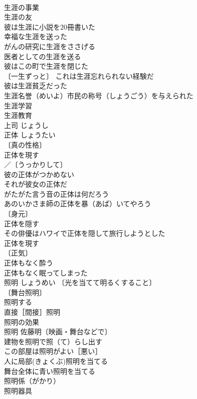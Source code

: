 \documentclass[8pt]{extreport}
\begin{document}
\begin{CJK}{UTF8}{min}
\\	生涯の事業 
\\	生涯の友 
\\	彼は生涯に小説を20冊書いた 
\\	幸福な生涯を送った 
\\	がんの研究に生涯をささげる 
\\	医者としての生涯を送る 
\\	彼はこの町で生涯を閉じた 
\\	〔一生ずっと〕 これは生涯忘れられない経験だ 
\\	彼は生涯貧乏だった 
\\	生涯名誉（めいよ）市民の称号（しょうごう）を与えられた 
\\	生涯学習 
\\	生涯教育 
\\	上司	じょうし	
\\	正体	しょうたい	
\\	〔真の性格〕
\\	正体を現す 
\\	／〔うっかりして〕
\\	彼の正体がつかめない 
\\	それが彼女の正体だ 
\\	がたがた言う音の正体は何だろう 
\\	あのいかさま師の正体を暴（あば）いてやろう 
\\	〔身元〕
\\	正体を隠す 
\\	その俳優はハワイで正体を隠して旅行しようとした 
\\	正体を現す 
\\	〔正気〕　
\\	正体もなく酔う 
\\	正体もなく眠ってしまった 
\\	照明	しょうめい	〔光を当てて明るくすること〕
\\	〔舞台照明〕
\\	照明する 
\\	直接［間接］照明 
\\	照明の効果 
\\	照明 佐藤明〔映画・舞台などで〕 
\\	建物を照明で照（て）らし出す 
\\	この部屋は照明がよい［悪い］ 
\\	人に局部(きょくぶ)照明を当てる 
\\	舞台全体に青い照明を当てる 
\\	照明係（がかり） 
\\	照明器具 

\end{CJK}
\end{document}

